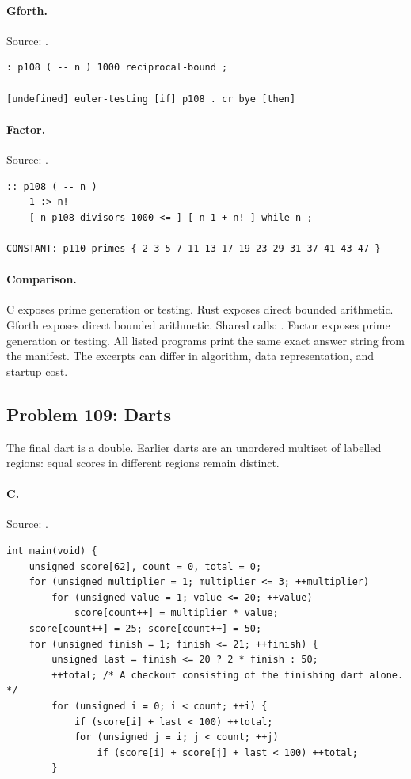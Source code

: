 \paragraph{Gforth.} Source: .
\begin{lstlisting}
: p108 ( -- n ) 1000 reciprocal-bound ;

[undefined] euler-testing [if] p108 . cr bye [then]
\end{lstlisting}

\paragraph{Factor.} Source: .
\begin{lstlisting}
:: p108 ( -- n )
    1 :> n!
    [ n p108-divisors 1000 <= ] [ n 1 + n! ] while n ;

CONSTANT: p110-primes { 2 3 5 7 11 13 17 19 23 29 31 37 41 43 47 }
\end{lstlisting}

\paragraph{Comparison.}
C exposes prime generation or testing. Rust exposes direct bounded arithmetic. Gforth exposes direct bounded arithmetic. Shared calls: \texttt{}. Factor exposes prime generation or testing.
All listed programs print the same exact answer string from the manifest. The excerpts can differ in algorithm, data representation, and startup cost.

\subsection{Problem 109: Darts}
\label{walkthrough:p109}
The final dart is a double. Earlier darts are an unordered multiset of labelled regions: equal scores in different regions remain distinct.

\paragraph{C.} Source: .
\begin{lstlisting}
int main(void) {
    unsigned score[62], count = 0, total = 0;
    for (unsigned multiplier = 1; multiplier <= 3; ++multiplier)
        for (unsigned value = 1; value <= 20; ++value)
            score[count++] = multiplier * value;
    score[count++] = 25; score[count++] = 50;
    for (unsigned finish = 1; finish <= 21; ++finish) {
        unsigned last = finish <= 20 ? 2 * finish : 50;
        ++total; /* A checkout consisting of the finishing dart alone. */
        for (unsigned i = 0; i < count; ++i) {
            if (score[i] + last < 100) ++total;
            for (unsigned j = i; j < count; ++j)
                if (score[i] + score[j] + last < 100) ++total;
        }
\end{lstlisting}

